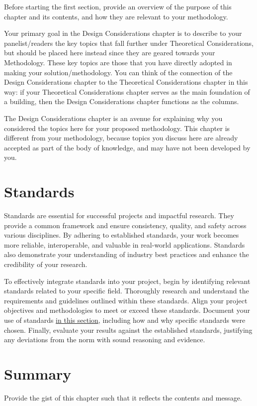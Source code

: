 Before starting the first section, provide an overview of the purpose of this chapter and its contents, and how they are relevant to your methodology. 

Your primary goal in the Design Considerations chapter is to describe to your panelist/readers the key topics that fall further under Theoretical Considerations, but should be placed here instead since they are geared towards your Methodology. These key topics are those that you have directly adopted in making your solution/methodology.  You can think of the connection of the Design Considerations chapter to the Theoretical Considerations chapter in this way: if your Theoretical Considerations chapter serves as the main foundation of a building, then the Design Considerations chapter functions as the columns. 

The  Design Considerations chapter is an avenue for explaining why you considered the topics here for your proposed methodology. This chapter is different from your methodology, because topics you discuss here are already accepted as part of the body of knowledge, and may have not been developed by you.  


\graytx{\Blindtext}

\section{Standards}

Standards are essential for successful projects and impactful research. They provide a common framework and ensure consistency, quality, and safety across various disciplines. By adhering to established standards, your work becomes more reliable, interoperable, and valuable in real-world applications. Standards also demonstrate your understanding of industry best practices and enhance the credibility of your research.

To effectively integrate standards into your project, begin by identifying relevant standards related to your specific field. Thoroughly research and understand the requirements and guidelines outlined within these standards. Align your project objectives and methodologies to meet or exceed these standards. Document your use of standards \underline{in this section}, including how and why specific standards were chosen. Finally, evaluate your results against the established standards, justifying any deviations from the norm with sound reasoning and evidence.

\section{Summary}

Provide the gist of this chapter such that it reflects the contents and message.